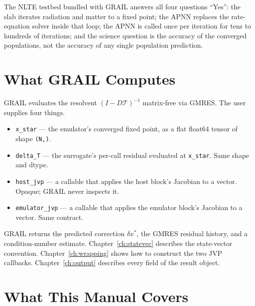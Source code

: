 \bigskip

The NLTE testbed bundled with GRAIL answers all four questions ``Yes'':
the slab iterates radiation and matter to a fixed point;
the APNN replaces the rate-equation solver inside that loop;
the APNN is called once per iteration for tens to hundreds of iterations;
and the science question is the accuracy of the converged populations, not the
accuracy of any single population prediction.

\section{What GRAIL Computes}
\label{sec:what-grail-computes}


GRAIL evaluates the resolvent $(I - D\mathcal{T})^{-1}$ matrix-free via GMRES.
The user supplies four things.

\begin{itemize}
  \item \texttt{x\_star} --- the emulator's converged fixed point, as a flat
        float64 tensor of shape \texttt{(N,)}.
  \item \texttt{delta\_T} --- the surrogate's per-call residual evaluated at
        \texttt{x\_star}.  Same shape and dtype.
  \item \texttt{host\_jvp} --- a callable that applies the host block's Jacobian
        to a vector.  Opaque; GRAIL never inspects it.
  \item \texttt{emulator\_jvp} --- a callable that applies the emulator block's
        Jacobian to a vector.  Same contract.
\end{itemize}

GRAIL returns the predicted correction $\delta x^*$, the GMRES residual history,
and a condition-number estimate.
Chapter~\ref{ch:statevec} describes the state-vector convention.
Chapter~\ref{ch:wrapping} shows how to construct the two JVP callbacks.
Chapter~\ref{ch:output} describes every field of the result object.

\section{What This Manual Covers}
\label{sec:manual-scope}

